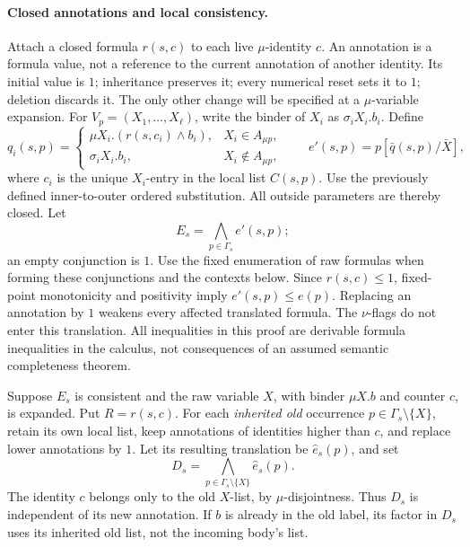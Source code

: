 \paragraph{Closed annotations and local consistency.}
Attach a closed formula \(r(s,c)\) to each
live \(\mu\)-identity \(c\). An annotation is
a formula value, not a reference to the current
annotation of another identity. Its initial value
is \(1\); inheritance preserves it; every
numerical reset sets it to \(1\); deletion
discards it. The only other change will
be specified at a \(\mu\)-variable expansion.
For \(V_p=(X_1,\ldots,X_\ell)\), write
the binder of \(X_i\) as \(\sigma_iX_i.b_i\).
Define
\[
 q_i(s,p)=
 \begin{cases}
  \mu X_i.(r(s,c_i)\land b_i),
       &X_i\in A_{\mu p},\\
  \sigma_iX_i.b_i,&X_i\notin A_{\mu p},
 \end{cases}
 \qquad
 e'(s,p)=p[\bar q(s,p)/\bar X],
\]
where \(c_i\) is the unique \(X_i\)-entry
in the local list \(C(s,p)\).
Use the previously defined inner-to-outer
ordered substitution. All outside parameters
are thereby closed. Let
\[
 E_s=\bigwedge_{p\in\Gamma_s}e'(s,p);
\]
an empty conjunction is \(1\).
Use the fixed enumeration of raw formulas when
forming these conjunctions and the contexts below.
Since \(r(s,c)\leq1\), fixed-point
monotonicity and positivity imply
\(e'(s,p)\leq e(p)\).
Replacing an annotation by \(1\) weakens
every affected translated formula.
The \(\nu\)-flags do not enter this translation.
All inequalities in this proof are
derivable formula inequalities in the
calculus, not consequences of an assumed
semantic completeness theorem.

Suppose \(E_s\) is consistent and the
raw variable \(X\), with binder
\(\mu X.b\) and counter \(c\), is expanded.
Put \(R=r(s,c)\).
For each \emph{inherited old} occurrence
\(p\in\Gamma_s\setminus\{X\}\), retain
its own local list, keep annotations
of identities higher than \(c\),
and replace lower annotations by \(1\).
Let its resulting translation be
\(\widehat e_s(p)\), and set
\[
 D_s=\bigwedge_{p\in\Gamma_s\setminus\{X\}}
                                      \widehat e_s(p).
\]
The identity \(c\) belongs only to
the old \(X\)-list, by \(\mu\)-disjointness.
Thus \(D_s\) is independent of its
new annotation. If \(b\) is already
in the old label, its factor in
\(D_s\) uses its inherited old list,
not the incoming body's list.

